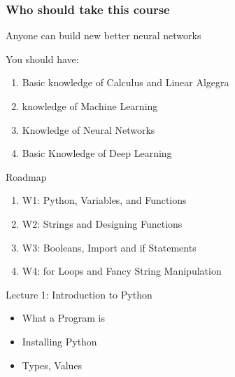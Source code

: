 \documentclass[14 pt]{beamer}
\let\olditem\item
\renewcommand{\item}{\olditem\vspace{4pt}}
\newcommand{\Alert}[1]{\textcolor{Alert}{#1}} %
\begin{document}
\begin{frame}
  \frametitle{Who should take this course}
  Anyone can build new better neural networks

You should have: 
  \begin{enumerate}
[circle]

\item Basic knowledge of Calculus and Linear Algegra
\item knowledge of Machine Learning
\item Knowledge of Neural Networks
\item Basic Knowledge of Deep Learning
\end{enumerate}
\end{frame}

\begin{frame}{Roadmap}
  \begin{enumerate}
[circle]
  \item \Alert{W1: Python, Variables, and Functions}
  \item W2: Strings and Designing Functions
  \item W3: Booleans, Import and if Statements
  \item W4: for Loops and Fancy String Manipulation
  \end{enumerate}
  \begin{block}{Lecture 1: Introduction to Python}
      \begin{itemize}
  \item What a Program is
  \item  Installing Python
  \item Types, Values
  \end{itemize}
  \end{block}
\end{frame}
\end{document}
